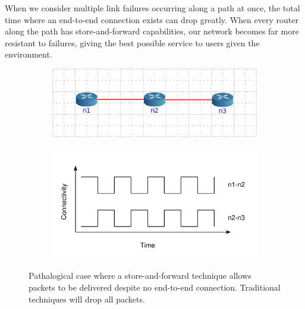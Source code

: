 \documentclass[withindex,glossary,openany]{cam-thesis}
\begin{document}
When we consider multiple link failures occurring along a path at once, the total time where an end-to-end connection exists can drop greatly. When every router along the path has store-and-forward capabilities, our network becomes far more resistant to failures, giving the best possible service to users given the environment.

\begin{center}
\begin{minipage}{0.9\textwidth} \centering
\begin{figure}[H]
\centering
\begin{subfigure}{.45\textwidth}
  \centering
  \includegraphics[width=1\linewidth]{pathalogical_topology}
  \label{fig:pathalogical_topology}
\end{subfigure}%
\begin{subfigure}{.55\textwidth}
  \centering
  \includegraphics[width=1\linewidth]{pathalogical_graph}
  \label{fig:pathalogical_graph}
\end{subfigure}
\caption{Pathalogical case where a store-and-forward technique allows packets to be delivered despite no end-to-end connection. Traditional techniques will drop all packets.}
\label{fig:pathalogical}
\end{figure}
\end{minipage}
\end{center}
\end{document}
